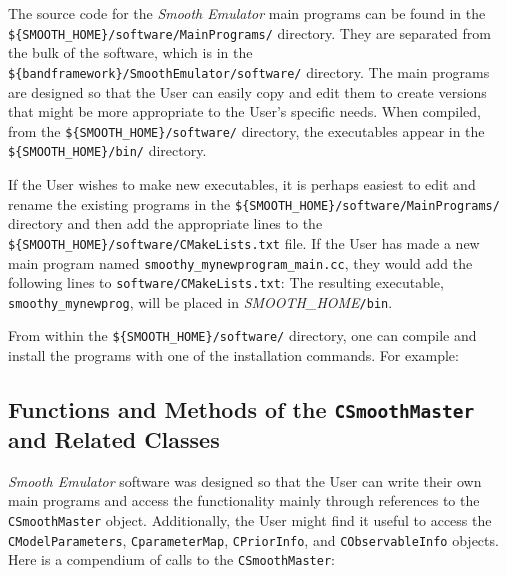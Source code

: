 \documentclass[UserManual.tex]{subfiles}
\begin{document}
\begin{sloppypar}
The source code for the {\it Smooth Emulator} main programs can be found in the \\{\tt \$\{SMOOTH\_HOME\}/software/MainPrograms/} directory. They are separated from the bulk of the software, which is in the {\tt \$\{bandframework\}/SmoothEmulator/software/} directory. The main programs are designed so that the User can easily copy and edit them to create versions that might be more appropriate to the User's specific needs. When compiled, from the {\tt \$\{SMOOTH\_HOME\}/software/} directory, the executables appear in the {\tt \$\{SMOOTH\_HOME\}/bin/} directory.

If the User wishes to make new executables, it is perhaps easiest to edit and rename the existing programs in the {\tt \$\{SMOOTH\_HOME\}/software/MainPrograms/} directory and then add the appropriate lines to the {\tt \$\{SMOOTH\_HOME\}/software/CMakeLists.txt} file. If the User has made a new main program named {\tt smoothy\_mynewprogram\_main.cc}, they would add the following lines to {\tt software/CMakeLists.txt}:
\vspace*{-8pt}
The resulting executable, {\tt smoothy\_mynewprog}, will be placed in \textit{SMOOTH\_HOME}{\tt /bin}.

From within the {\tt \$\{SMOOTH\_HOME\}/software/} directory, one can compile and install the programs with one of the installation commands. For example:
\vspace*{-8pt}



\subsection{Functions and Methods of the {\tt CSmoothMaster} and Related Classes}
{\it Smooth Emulator} software was designed so that the User can write their own main programs and access the functionality mainly through references to the {\tt CSmoothMaster} object. Additionally, the User might find it useful to access the {\tt CModelParameters}, {\tt CparameterMap}, {\tt CPriorInfo}, and {\tt CObservableInfo} objects. Here is a compendium of calls to the {\tt CSmoothMaster}:


\end{sloppypar}
\end{document}
